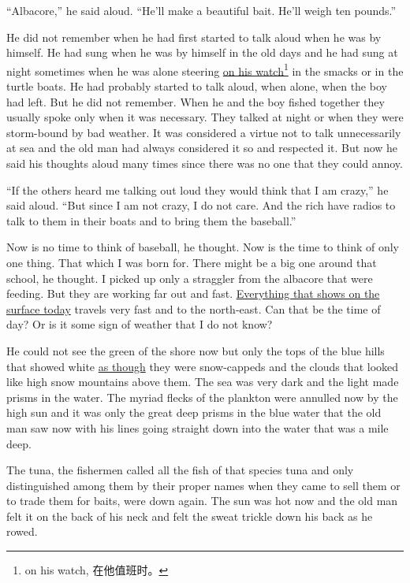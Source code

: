 ``Albacore,'' he said aloud. ``He'll make a beautiful bait. He'll weigh ten pounds.''

He did not remember when he had first started to talk aloud when he was by
himself. He had \gls{sung} when he was by himself in the old days and he had
sung at night sometimes when he was alone steering \uline{on his
  watch}\footnote{on his watch, 在他值班时。} in the \glspl{smack} or in the
turtle boats. He had probably started to talk aloud, when alone, when the
boy had left. But he did not remember. When he and the boy fished together
they usually spoke only when it was necessary. They talked at night or when
they were \gls{storm-bound} by bad weather. It was \gls{considered} a
\gls{virtue} not to talk unnecessarily at sea and the old man had always
considered it so and respected it. But now he said his thoughts \gls{aloud}
many times since there was no one that they could \gls{annoy}.

``If the others heard me talking out loud they would think that I am
crazy,'' he said aloud. ``But since I am not crazy, I do not care. And the
rich have radios to talk to them in their boats and to bring them the
baseball.''

Now is no time to think of baseball, he thought. Now is the time to think of
only one thing. That which I was born for. There might be a big one around
that school, he thought. I picked up only a \gls{straggler} from the
albacore that were feeding. But they are working far out and fast.
\uline{Everything that shows on the surface today} travels very fast and to the
north-east. Can that be the time of day? Or is it some \gls{sign} of weather that
I do not know?

He could not see the green of the shore now but only the tops of the blue
hills that showed white \uline{as though} they were snow-\glspl{capped} and the
clouds that looked like high snow mountains above them. The sea was very
dark and the light made \glspl{prism} in the water. The \gls{myriad}
\glspl{fleck} of the plankton were \gls{annulled} now by the high sun and it
was only the great deep prisms in the blue water that the old man saw now
with his lines going straight down into the water that was a mile deep.

The tuna, the fishermen called all the fish of that \gls{species} tuna and
only \gls{distinguished} \gls{among} them by their proper names when they
came to sell them or to trade them for baits, were down again. The sun was
hot now and the old man felt it on the back of his neck and felt the \gls{sweat}
\gls{trickle} down his back as he rowed.

